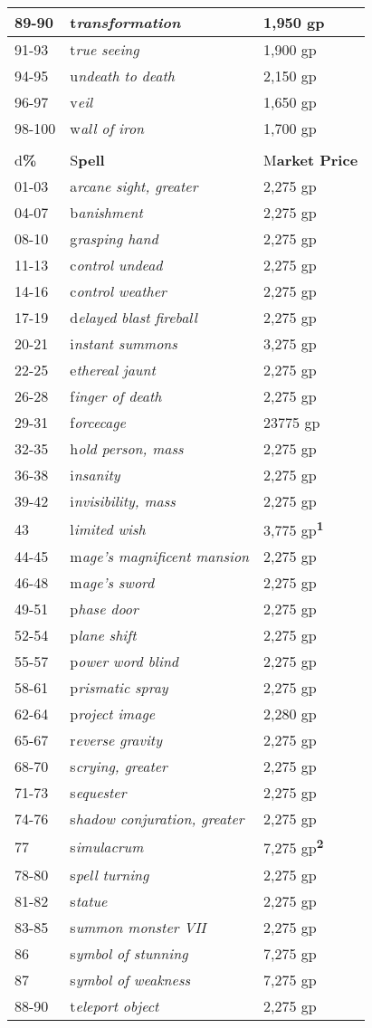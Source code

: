 \documentclass{article}
\begin{document}
\begin{tabular}{|>{\raggedright}p{28pt}|>{\raggedright}p{200pt}|>{\raggedright}p{85pt}|}
\hline
89-90 & t\textit{ransformation} & 1,950 gp\tabularnewline
\hline
91-93 & t\textit{rue seeing} & 1,900 gp\tabularnewline
\hline
94-95 & u\textit{ndeath to death} & 2,150 gp\tabularnewline
\hline
96-97 & v\textit{eil} & 1,650 gp\tabularnewline
\hline
98-100 & w\textit{all of iron} & 1,700 gp\tabularnewline
\hline
\multicolumn{3}{|p{314pt}|}{7\textit{\textbf{th-Level Arcane Spells}}}\tabularnewline
\hline
d\textbf{\%} & S\textbf{pell} & M\textbf{arket Price}\tabularnewline
\hline
01-03 & a\textit{rcane sight, greater} & 2,275 gp\tabularnewline
\hline
04-07 & b\textit{anishment} & 2,275 gp\tabularnewline
\hline
08-10 & g\textit{rasping hand} & 2,275 gp\tabularnewline
\hline
11-13 & c\textit{ontrol undead} & 2,275 gp\tabularnewline
\hline
14-16 & c\textit{ontrol weather} & 2,275 gp\tabularnewline
\hline
17-19 & d\textit{elayed blast fireball} & 2,275 gp\tabularnewline
\hline
20-21 & i\textit{nstant summons} & 3,275 gp\tabularnewline
\hline
22-25 & e\textit{thereal jaunt} & 2,275 gp\tabularnewline
\hline
26-28 & f\textit{inger of death} & 2,275 gp\tabularnewline
\hline
29-31 & f\textit{orcecage} & 23775 gp\tabularnewline
\hline
32-35 & h\textit{old person, mass} & 2,275 gp\tabularnewline
\hline
36-38 & i\textit{nsanity} & 2,275 gp\tabularnewline
\hline
39-42 & i\textit{nvisibility, mass} & 2,275 gp\tabularnewline
\hline
43 & l\textit{imited wish} & 3,775 gp\textsuperscript{\textbf{1}}\tabularnewline
\hline
44-45 & m\textit{age's magnificent mansion} & 2,275 gp\tabularnewline
\hline
46-48 & m\textit{age's sword} & 2,275 gp\tabularnewline
\hline
49-51 & p\textit{hase door} & 2,275 gp\tabularnewline
\hline
52-54 & p\textit{lane shift} & 2,275 gp\tabularnewline
\hline
55-57 & p\textit{ower word blind} & 2,275 gp\tabularnewline
\hline
58-61 & p\textit{rismatic spray} & 2,275 gp\tabularnewline
\hline
62-64 & p\textit{roject image} & 2,280 gp\tabularnewline
\hline
65-67 & r\textit{everse gravity} & 2,275 gp\tabularnewline
\hline
68-70 & s\textit{crying, greater} & 2,275 gp\tabularnewline
\hline
71-73 & s\textit{equester} & 2,275 gp\tabularnewline
\hline
74-76 & s\textit{hadow conjuration, greater} & 2,275 gp\tabularnewline
\hline
77 & s\textit{imulacrum} & 7,275 gp\textsuperscript{\textbf{2}}\tabularnewline
\hline
78-80 & s\textit{pell turning} & 2,275 gp\tabularnewline
\hline
81-82 & s\textit{tatue} & 2,275 gp\tabularnewline
\hline
83-85 & s\textit{ummon monster VII} & 2,275 gp\tabularnewline
\hline
86 & s\textit{ymbol of stunning} & 7,275 gp\tabularnewline
\hline
87 & s\textit{ymbol of weakness} & 7,275 gp\tabularnewline
\hline
88-90 & t\textit{eleport object} & 2,275 gp\tabularnewline

\end{tabular}
\end{document}
